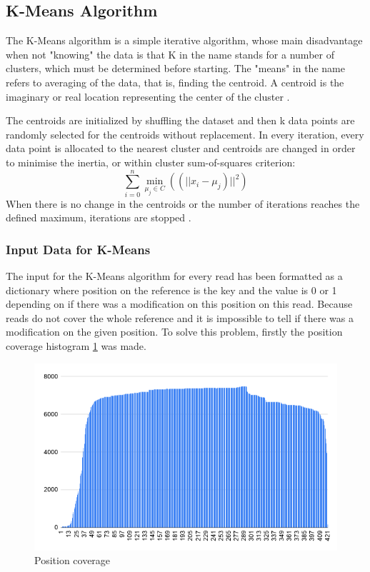 \documentclass[times, utf8, zavrsni, numeric]{fer}
\begin{document}
\subsection{K-Means Algorithm}
The K-Means algorithm is a simple iterative algorithm, whose main disadvantage when not "knowing" the data
is that K in the name stands for a number of clusters, which must be determined before starting.
The "means" in the name refers to averaging of the data, that is, finding the centroid.
A centroid is the imaginary or real location representing the center of the cluster \cite{KMeansArticle}.

The centroids are initialized by shuffling the dataset and then k data points are randomly selected 
for the centroids without replacement. In every iteration, every data point is allocated to the nearest 
cluster and centroids are changed in order to minimise the inertia, or within cluster sum-of-squares criterion: 
\begin{equation}
    \sum^n_{i=0}\min_{\mu_j\in C}((||x_i-\mu_j)||^2)
\end{equation} 
When there is no change in the centroids or the number of iterations reaches the defined maximum, 
iterations are stopped \cite{kmeansSklearn}.

\subsubsection{Input Data for K-Means}
The input for the K-Means algorithm for every read has been formatted as a dictionary where position on 
the reference is the key and the value is 0 or 1 depending on if there was a modification on this position on 
this read. Because reads do not cover the whole reference and it is impossible to tell if there 
was a modification on the given position. To solve this problem, firstly the position coverage
histogram \ref{fig:positionCoverage} was made.

\begin{figure}[H]
    \centering
    \includegraphics[width=\linewidth]{figures/position_coverage}
    \caption{Position coverage}
    \label{fig:positionCoverage}
\end{figure}
\end{document}
